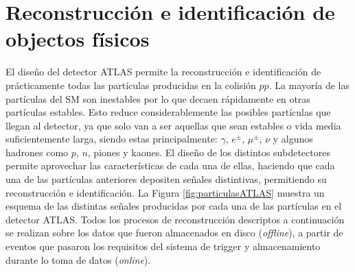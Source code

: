 \chapter{Reconstrucción e identificación de objectos físicos}\label{cap:objects}



El diseño del detector ATLAS permite la reconstrucción e identificación de prácticamente todas las
partículas producidas en la colisión $pp$. 
La mayoría de las partículas del SM son inestables por lo que decaen rápidamente en otras partículas estables. Esto reduce considerablemente las posibles partículas que llegan
al detector, ya que solo van a ser aquellas que sean estables o vida media suficientemente larga, siendo estas principalmente: $\gamma$, $e^{\pm}$, $\mu^{\pm}$, $\nu$ y algunos hadrones
como $p$, $n$, piones y kaones. El diseño de los distintos subdetectores permite aprovechar las
características de cada una de ellas, haciendo que cada una de las partículas anteriores depositen señales distintivas, permitiendo su reconstrucción e identificación. La Figura \ref{fig:particulasATLAS} muestra un esquema de las distintas señales producidas por cada una de las partículas en el detector ATLAS. Todos los procesos de reconstrucción descriptos a continuación se realizan sobre los datos que fueron almacenados en disco (\textit{offline}), a partir de eventos que pasaron los requisitos del sistema de trigger y almacenamiento durante lo toma de datos (\textit{online}).




